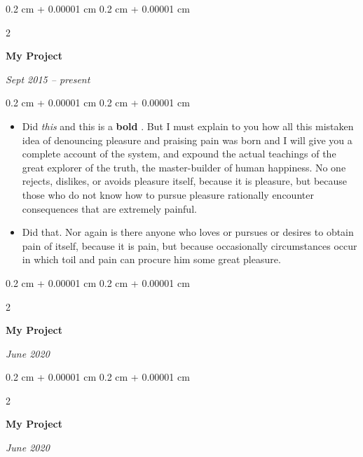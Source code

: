 \documentclass[10pt, letterpaper]{article}
\newenvironment{highlights}{
    \begin{itemize}[
        topsep=0.10 cm,
        parsep=0.10 cm,
        partopsep=0pt,
        itemsep=0pt,
        leftmargin=0.4 cm + 10pt
    ]
}{
    \end{itemize}
} %
\newenvironment{onecolentry}{
    \begin{adjustwidth}{
        0.2 cm + 0.00001 cm
    }{
        0.2 cm + 0.00001 cm
    }
}{
    \end{adjustwidth}
} %
\newenvironment{twocolentry}[2][]{
    \onecolentry
    \def\secondColumn{#2}
    \setcolumnwidth{\fill, 4.5 cm}
    \begin{paracol}{2}
}{
    \switchcolumn \raggedleft \secondColumn
    \end{paracol}
    \endonecolentry
} %
\let\hrefWithoutArrow\href
\renewcommand{\href}[2]{\hrefWithoutArrow{#1}{\ifthenelse{\equal{#2}{}}{ }{#2 }\raisebox{.15ex}{\footnotesize \faExternalLink*}}}
\begin{document}
        \begin{twocolentry}{
            
            
        \textit{Sept 2015 – present}}
            \textbf{My Project}
        \end{twocolentry}

        \vspace{0.10 cm}
        \begin{onecolentry}
            \begin{highlights}
                \item Did \textit{this} and this is a \textbf{bold} \href{https://example.com}{link}. But I must explain to you how all this mistaken idea of denouncing pleasure and praising pain was born and I will give you a complete account of the system, and expound the actual teachings of the great explorer of the truth, the master-builder of human happiness. No one rejects, dislikes, or avoids pleasure itself, because it is pleasure, but because those who do not know how to pursue pleasure rationally encounter consequences that are extremely painful.
                \item Did that. Nor again is there anyone who loves or pursues or desires to obtain pain of itself, because it is pain, but because occasionally circumstances occur in which toil and pain can procure him some great pleasure.
            \end{highlights}
        \end{onecolentry}


        \vspace{0.2 cm}

        \begin{twocolentry}{
            
            
        \textit{June 2020}}
            \textbf{My Project}
        \end{twocolentry}



        \vspace{0.2 cm}

        \begin{twocolentry}{
            
            
        \textit{June 2020}}
            \textbf{My Project}
        \end{twocolentry}
\end{document}
